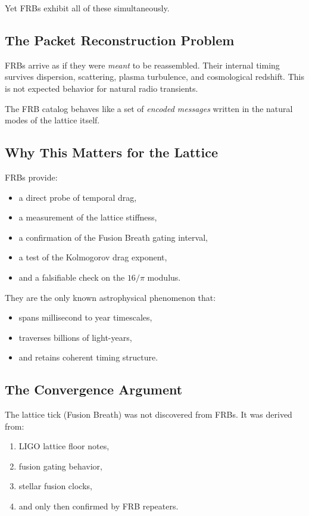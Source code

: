 \documentclass[11pt, letterpaper, openany]{book}
\begin{document}
Yet FRBs exhibit all of these simultaneously.

\subsection*{The Packet Reconstruction Problem}
FRBs arrive as if they were \emph{meant} to be reassembled.  
Their internal timing survives dispersion, scattering, plasma turbulence, and cosmological redshift.  
This is not expected behavior for natural radio transients.

The FRB catalog behaves like a set of \emph{encoded messages} written in the natural modes of the 
lattice itself.

\subsection*{Why This Matters for the Lattice}
FRBs provide:

\begin{itemize}
    \item a direct probe of temporal drag,
    \item a measurement of the lattice stiffness,
    \item a confirmation of the Fusion Breath gating interval,
    \item a test of the Kolmogorov drag exponent,
    \item and a falsifiable check on the $16/\pi$ modulus.
\end{itemize}

They are the only known astrophysical phenomenon that:

\begin{itemize}
    \item spans millisecond to year timescales,
    \item traverses billions of light-years,
    \item and retains coherent timing structure.
\end{itemize}

\subsection*{The Convergence Argument}
The lattice tick (Fusion Breath) was not discovered from FRBs.  
It was derived from:

\begin{enumerate}
    \item LIGO lattice floor notes,
    \item fusion gating behavior,
    \item stellar fusion clocks,
    \item and only then confirmed by FRB repeaters.
\end{enumerate}
\end{document}
